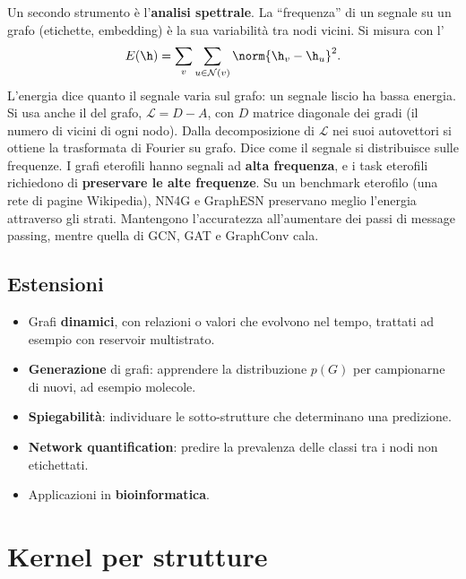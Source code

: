 Un secondo strumento è l'\textbf{analisi spettrale}. La ``frequenza'' di un segnale su un grafo (etichette,
embedding) è la sua variabilità tra nodi vicini. Si misura con l'
\[
E(\h) = \sum_v\sum_{u\in\mathcal N(v)}\norm{\h_v-\h_u}^2 .
\]
L'energia dice quanto il segnale varia sul grafo: un segnale liscio ha bassa energia. Si usa anche il
 del grafo, $\mathcal L = D-A$, con $D$ matrice diagonale dei gradi (il numero di vicini di
ogni nodo). Dalla decomposizione di $\mathcal L$ nei suoi autovettori si ottiene la trasformata di Fourier su grafo.
Dice come il segnale si distribuisce sulle frequenze. I grafi eterofili hanno segnali ad \textbf{alta frequenza}, e
i task eterofili richiedono di \textbf{preservare le alte frequenze}. Su un benchmark eterofilo (una rete di pagine
Wikipedia), NN4G e GraphESN preservano meglio l'energia attraverso gli strati. Mantengono l'accuratezza
all'aumentare dei passi di message passing, mentre quella di GCN, GAT e GraphConv cala.

\subsection{Estensioni}

\begin{itemize}
  \item Grafi \textbf{dinamici}, con relazioni o valori che evolvono nel tempo, trattati ad esempio con reservoir
        multistrato.
  \item \textbf{Generazione} di grafi: apprendere la distribuzione $p(G)$ per campionarne di nuovi, ad esempio
        molecole.
  \item \textbf{Spiegabilità}: individuare le sotto-strutture che determinano una predizione.
  \item \textbf{Network quantification}: predire la prevalenza delle classi tra i nodi non etichettati.
  \item Applicazioni in \textbf{bioinformatica}.
\end{itemize}

\section{Kernel per strutture}
\label{sec:kernel-strutture}

